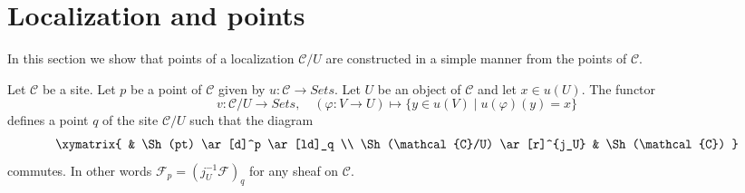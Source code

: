 \section{Localization and points}
\label{section-localize-points}

\noindent
In this section we show that points of a localization $\mathcal{C}/U$
are constructed in a simple manner from the points of $\mathcal{C}$.

\begin{lemma}
\label{lemma-point-localize}
Let $\mathcal{C}$ be a site. Let $p$ be a point of $\mathcal{C}$ given by
$u : \mathcal{C} \to \textit{Sets}$. Let $U$ be an object of $\mathcal{C}$
and let $x \in u(U)$. The functor
$$
v : \mathcal{C}/U \longrightarrow \textit{Sets}, \quad
(\varphi : V \to U) \longmapsto \{y \in u(V) \mid u(\varphi)(y) = x\}
$$
defines a point $q$ of the site $\mathcal{C}/U$ such that the diagram
$$
\xymatrix{
& \Sh(pt) \ar[d]^p \ar[ld]_q \\
\Sh(\mathcal{C}/U) \ar[r]^{j_U} &
\Sh(\mathcal{C})
}
$$
commutes. In other words
$\mathcal{F}_p = (j_U^{-1}\mathcal{F})_q$ for any
sheaf on $\mathcal{C}$.
\end{lemma}

